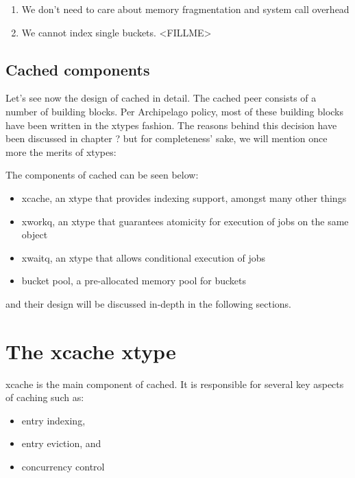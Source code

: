 \begin{enumerate}
	\item We don't need to care about memory fragmentation and system call 
		overhead
	\item We cannot index single buckets. <FILLME>
\end{enumerate}

\subsection{Cached components}

Let's see now the design of cached in detail. The cached peer consists of a 
number of building blocks.  Per Archipelago policy, most of these building 
blocks have been written in the xtypes fashion. The reasons behind this decision 
have been discussed in chapter ?
but for completeness' sake, we will mention once more the merits of xtypes:



The components of cached can be seen below:

\begin{itemize}
	\item xcache, an xtype that provides indexing support, amongst many 
		other things
	\item xworkq, an xtype that guarantees atomicity for execution of jobs 
		on the same object
	\item xwaitq, an xtype that allows conditional execution of jobs
	\item bucket pool, a pre-allocated memory pool for buckets
\end{itemize}

and their design will be discussed in-depth in the following sections.

\section{The xcache xtype}\label{sec:xcache-design}

xcache is the main component of cached. It is responsible for several key 
aspects of caching such as:

\begin{itemize}
	\item entry indexing,
	\item entry eviction, and
	\item concurrency control
\end{itemize}

